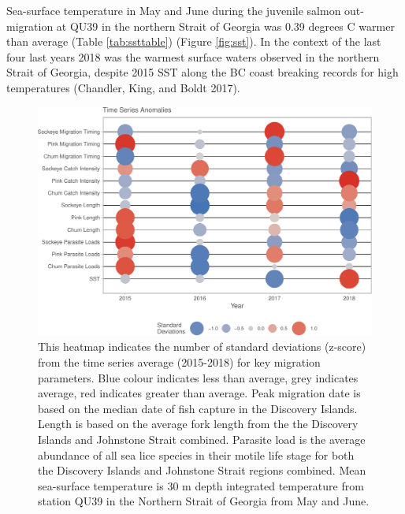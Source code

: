 \documentclass[fleqn,10pt]{wlpeerj} %
\begin{document}
Sea-surface temperature in May and June during the juvenile salmon
out-migration at QU39 in the northern Strait of Georgia was 0.39 degrees
C warmer than average (Table \ref{tab:ssttable}) (Figure \ref{fig:sst}).
In the context of the last four last years 2018 was the warmest surface
waters observed in the northern Strait of Georgia, despite 2015 SST
along the BC coast breaking records for high temperatures (Chandler,
King, and Boldt 2017).

\begin{figure}[H]
\includegraphics[width=0.95\linewidth]{Migration_Observations_Report_files/figure-latex/heatmap-1} \caption{This heatmap indicates the number of standard deviations (z-score) from the time series average (2015-2018) for key migration parameters. Blue colour indicates less than average, grey indicates average, red indicates greater than average. Peak migration date is based on the median date of fish capture in the Discovery Islands. Length is based on the average fork length from the the Discovery Islands and Johnstone Strait combined. Parasite load is the average abundance of all sea lice species in their motile life stage for both the Discovery Islands and Johnstone Strait regions combined. Mean sea-surface temperature is 30 m depth integrated temperature from station QU39 in the Northern Strait of Georgia from May and June.}\label{fig:heatmap}
\end{figure}
\end{document}
